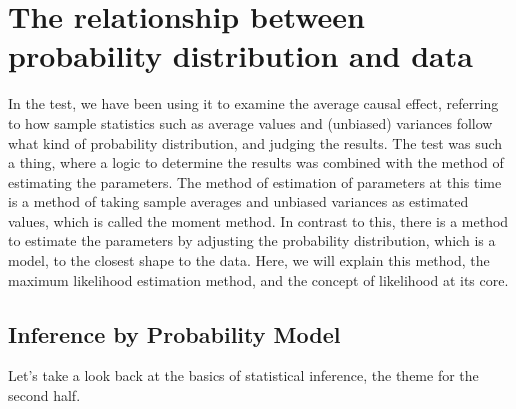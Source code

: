 \documentclass{ltjsbook}
\begin{document}
\chapter{The relationship between probability distribution and data}
\label{m23_likelihood}
In the test, we have been using it to examine the average causal effect, referring to how sample statistics such as average values and (unbiased) variances follow what kind of probability distribution, and judging the results. The test was such a thing, where a logic to determine the results was combined with the method of estimating the parameters. The method of estimation of parameters at this time is a method of taking sample averages and unbiased variances as estimated values, which is called the moment method. In contrast to this, there is a method to estimate the parameters by adjusting the probability distribution, which is a model, to the closest shape to the data. Here, we will explain this method, the maximum likelihood estimation method, and the concept of likelihood at its core.
\section{Inference by Probability Model}
Let's take a look back at the basics of statistical inference, the theme for the second half.
\end{document}
